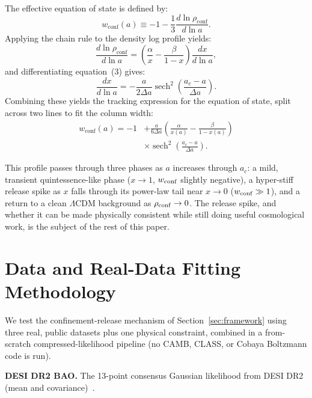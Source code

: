 \documentclass[11pt,a4paper,twocolumn]{article}
\begin{document}
The effective equation of state is defined by:
\begin{equation}
w_{\text{conf}}(a) \equiv -1 - \frac{1}{3}\frac{d \ln \rho_{\text{conf}}}{d \ln a}.
\end{equation}
Applying the chain rule to the density log profile yields:
\begin{equation}
\frac{d \ln \rho_{\text{conf}}}{d \ln a} = \left( \frac{\alpha}{x} - \frac{\beta}{1 - x} \right) \frac{dx}{d \ln a},
\end{equation}
and differentiating equation~(3) gives:
\begin{equation}
\frac{dx}{d \ln a} = - \frac{a}{2\Delta a} \operatorname{sech}^2 \left( \frac{a_c - a}{\Delta a} \right).
\end{equation}
Combining these yields the tracking expression for the equation of state, split across two lines to fit the column width:
\begin{equation}
\begin{split}
w_{\text{conf}}(a) = -1 &+ \frac{a}{6\Delta a} \left( \frac{\alpha}{x(a)} - \frac{\beta}{1 - x(a)} \right) \\
&\times \operatorname{sech}^2 \left( \frac{a_c - a}{\Delta a} \right).
\end{split}
\end{equation}

This profile passes through three phases as $a$ increases through $a_c$: a mild, transient quintessence-like phase ($x \to 1$, $w_{\rm conf}$ slightly negative), a hyper-stiff release spike as $x$ falls through its power-law tail near $x \to 0$ ($w_{\rm conf} \gg 1$), and a return to a clean $\Lambda$CDM background as $\rho_{\rm conf} \to 0$. The release spike, and whether it can be made physically consistent while still doing useful cosmological work, is the subject of the rest of this paper.

\section{Data and Real-Data Fitting Methodology}
\label{sec:data}
We test the confinement-release mechanism of Section~\ref{sec:framework} using three real, public datasets plus one physical constraint, combined in a from-scratch compressed-likelihood pipeline (no CAMB, CLASS, or Cobaya Boltzmann code is run).

\textbf{DESI DR2 BAO.} The 13-point consensus Gaussian likelihood from DESI DR2 (mean and covariance)~\cite{desi2025}.
\end{document}
